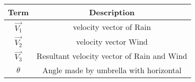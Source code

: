 \begin{tabular}[12ptx]{ |c| c|}
\hline\textbf{Term} & \textbf{Description}\\
\hline
$\vec{V_{1}}$ & velocity vector of Rain\\
\hline
\hline
$\vec{V_{2}}$ & velocity vector Wind\\
\hline
$\vec{V_{3}}$ & Resultant velocity vector of Rain and Wind\\
\hline
$\theta$ & Angle made by umbrella with horizontal\\
\hline
\end{tabular}


